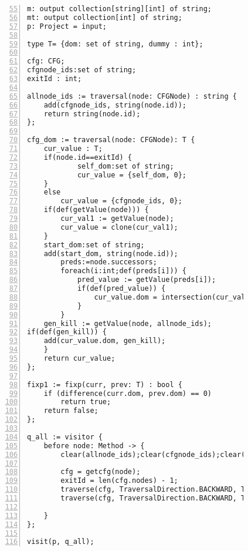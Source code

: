 \begin{figure}[ht!]
\begin{lstlisting}[numbers=left, tabsize=4, escapechar=@, caption={Post Dominator analysis},label={lst:post-dominator-code},firstline=55, firstnumber=55] 
m: output collection[string][int] of string;
mt: output collection[int] of string;
p: Project = input;

type T= {dom: set of string, dummy : int};
	
cfg: CFG;
cfgnode_ids:set of string;
exitId : int;

allnode_ids := traversal(node: CFGNode) : string {
	add(cfgnode_ids, string(node.id));
	return string(node.id);
};

cfg_dom := traversal(node: CFGNode): T {
	cur_value : T;
	if(node.id==exitId) {
			self_dom:set of string;
			cur_value = {self_dom, 0};
	}
	else
		cur_value = {cfgnode_ids, 0};
	if(def(getValue(node))) {
		cur_val1 := getValue(node);
		cur_value = clone(cur_val1);
	}
	start_dom:set of string;
	add(start_dom, string(node.id));
		preds:=node.successors;
		foreach(i:int;def(preds[i])) {
			pred_value := getValue(preds[i]);
			if(def(pred_value)) {
				cur_value.dom = intersection(cur_value.dom,pred_value.dom);
			}
		}	
	gen_kill := getValue(node, allnode_ids);
if(def(gen_kill)) {
	add(cur_value.dom, gen_kill);
	}
	return cur_value;
};

fixp1 := fixp(curr, prev: T) : bool {
 	if (difference(curr.dom, prev.dom) == 0)
 		return true;	
 	return false;
};

q_all := visitor {
	before node: Method -> {
		clear(allnode_ids);clear(cfgnode_ids);clear(cfg_dom);

		cfg = getcfg(node);
		exitId = len(cfg.nodes) - 1;
		traverse(cfg, TraversalDirection.BACKWARD, TraversalKind.HYBRID, allnode_ids);
		traverse(cfg, TraversalDirection.BACKWARD, TraversalKind.HYBRID, cfg_dom, fixp1);
		
	}
};

visit(p, q_all);

\end{lstlisting}
\end{figure}